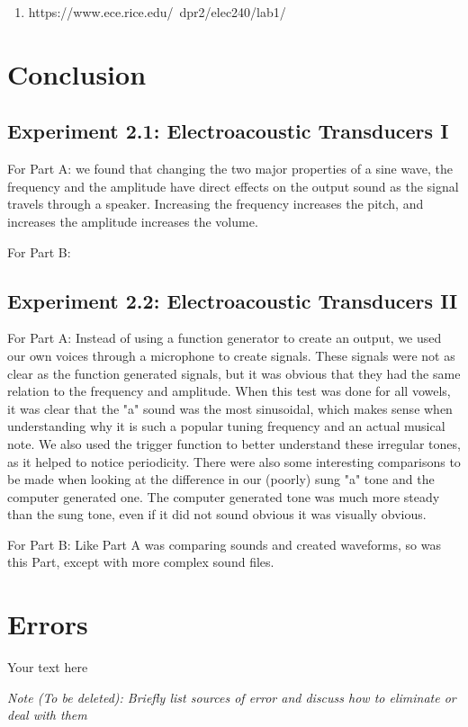 \documentclass[10pt]{article}
\begin{document}
	\begin{enumerate}
		\item https://www.ece.rice.edu/~dpr2/elec240/lab1/
	\end{enumerate}
\medskip


\section{Conclusion}
\subsection{Experiment 2.1: Electroacoustic Transducers I}
\qquad For Part A: we found that changing the two major properties of a sine wave, the frequency and the amplitude have direct effects on the output sound as the signal travels through a speaker. Increasing the frequency increases the pitch, and increases the amplitude increases the volume.

For Part B: 

\subsection{Experiment 2.2: Electroacoustic Transducers II}
For Part A: Instead of using a function generator to create an output, we used our own voices through a microphone to create signals. These signals were not as clear as the function generated signals, but it was obvious that they had the same relation to the frequency and amplitude. When this test was done for all vowels, it was clear that the "a" sound was the most sinusoidal, which makes sense when understanding why it is such a popular tuning frequency and an actual musical note. We also used the trigger function to better understand these irregular tones, as it helped to notice periodicity. There were also some interesting comparisons to be made when looking at the difference in our (poorly) sung "a" tone and the computer generated one. The computer generated tone was much more steady than the sung tone, even if it did not sound obvious it was visually obvious. 

For Part B: Like Part A was comparing sounds and created waveforms, so was this Part, except with more complex sound files. 


\medskip



\section{Errors}

Your text here

\medskip

\textit{Note (To be deleted): Briefly list sources of error and discuss how to eliminate or deal with them}
\end{document}
